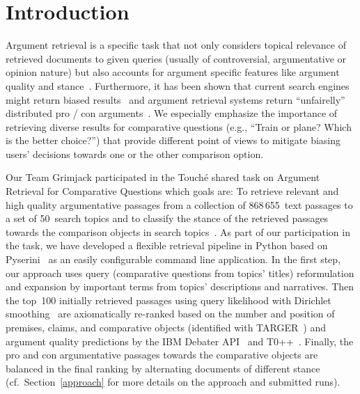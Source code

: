 
\section{Introduction}\label{intro}

Argument retrieval is a specific task that not only considers topical relevance of retrieved documents to given queries (usually of controversial, argumentative or opinion nature) but also accounts for argument specific features like argument quality and stance~\cite{BondarenkoFBGAPBSWPH2020, BondarenkoGFBAPBSWPH2021}.  
Furthermore, it has been shown that current search engines might return biased results~\cite{ShahB2022} and argument retrieval systems return ``unfairelly'' distributed pro / con arguments~\cite{CherumanalSSC2021}.
We especially emphasize the importance of retrieving diverse results for comparative questions (e.g., ``Train or plane? Which is the better choice?'') that provide different point of views to mitigate biasing users' decisions towards one or the other comparison option.

Our Team Grimjack participated in the Touch{\'e} shared task on Argument Retrieval for Comparative Questions which goals are: \Ni To retrieve relevant and high quality argumentative passages from a collection of 868\,655~text passages to a set of 50~search topics and \Nii to classify the stance of the retrieved passages towards the comparison objects in search topics~\cite{BondarenkoFKSGBPBSWPH2022}.
As part of our participation in the task, we have developed a flexible retrieval pipeline in Python based on Pyserini~\cite{LinMLYPN2021} as an easily configurable command line application.
In the first step, our approach uses query (comparative questions from topics' titles) reformulation and expansion by important terms from topics' descriptions and narratives. Then the top~100 initially retrieved passages using query likelihood with Dirichlet smoothing~\cite{ZhaiL2001} are axiomatically re-ranked based on the number and position of premises, claims, and comparative objects (identified with TARGER~\cite{ChernodubOHBHBP2019}) and argument quality predictions by the IBM Debater API~\cite{ToledoGCFVLJAS2019} and T0++~\cite{SanhWRBSACSLRDBXTSSKCNDCJWMSYPBWNRSSFFTBGBWR2021}.
Finally, the pro and con argumentative passages towards the comparative objects are balanced in the final ranking by alternating documents of different stance (cf.\ Section~\ref{approach} for more details on the approach and submitted runs).

